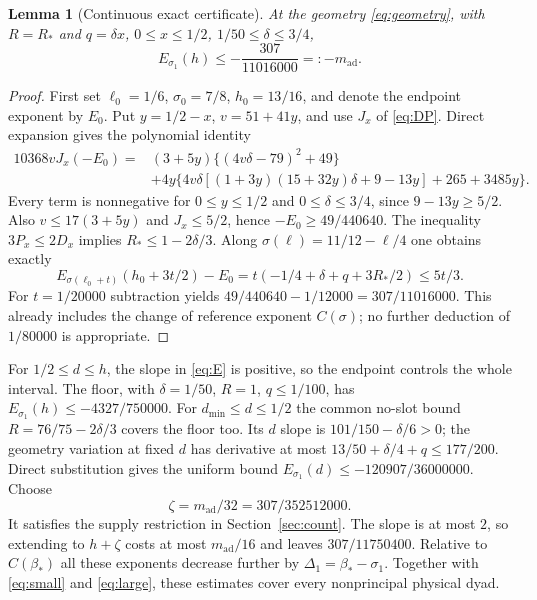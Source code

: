 \documentclass[11pt,a4paper]{article}
\newtheorem{lemma}[theorem]{Lemma}
\theoremstyle{definition}
\newcommand{\sig}{\sigma_1}
\newcommand{\bet}{\beta_*}
\begin{document}
\begin{lemma}[Continuous exact certificate]\label{lem:certificate}
At the geometry \eqref{eq:geometry}, with $R=R_*$ and
$q=\delta x$, $0\le x\le1/2$, $1/50\le\delta\le3/4$,
\[
 E_{\sig}(h)\le-\frac{307}{11016000}=:-m_{\mathrm{ad}}.
\]
\end{lemma}
\begin{proof}
First set $\ell_0=1/6$, $\sigma_0=7/8$, $h_0=13/16$,
and denote the endpoint exponent by $E_0$. Put
$y=1/2-x$, $v=51+41y$, and use $J_x$ of \eqref{eq:DP}.
Direct expansion gives the polynomial identity
\begin{align*}
 10368vJ_x(-E_0)
 ={}&(3+5y)\{(4v\delta-79)^2+49\}\\
 &+4y\{4v\delta[(1+3y)(15+32y)\delta+9-13y]
                       +265+3485y\}.
\end{align*}
Every term is nonnegative for $0\le y\le1/2$ and
$0\le\delta\le3/4$, since $9-13y\ge5/2$.
Also $v\le17(3+5y)$ and $J_x\le5/2$, hence
$-E_0\ge49/440640$.
The inequality $3P_x\le2D_x$ implies $R_*\le1-2\delta/3$.
Along $\sigma(\ell)=11/12-\ell/4$ one obtains exactly
\[
 E_{\sigma(\ell_0+t)}(h_0+3t/2)-E_0
 =t(-1/4+\delta+q+3R_*/2)\le5t/3.
\]
For $t=1/20000$ subtraction yields
$49/440640-1/12000=307/11016000$.
This already includes the change of reference exponent $C(\sigma)$;
no further deduction of $1/80000$ is appropriate.
\end{proof}

For $1/2\le d\le h$, the slope in \eqref{eq:E} is positive,
so the endpoint controls the whole interval.
The floor, with $\delta=1/50$, $R=1$, $q\le1/100$,
has $E_{\sig}(h)\le-4327/750000$.
For $d_{\min}\le d\le1/2$ the common no-slot bound
$R=76/75-2\delta/3$ covers the floor too. Its $d$ slope is
$101/150-\delta/6>0$; the geometry variation at fixed $d$
has derivative at most $13/50+\delta/4+q\le177/200$.
Direct substitution gives the uniform bound
$E_{\sig}(d)\le-120907/36000000$.
Choose
\begin{equation}\label{eq:zeta}
 \zeta=m_{\mathrm{ad}}/32=307/352512000.
\end{equation}
It satisfies the supply restriction in Section~\ref{sec:count}.
The slope is at most $2$, so extending to $h+\zeta$ costs at
most $m_{\mathrm{ad}}/16$ and leaves
$307/11750400$.
Relative to $C(\bet)$ all these exponents decrease further by
$\Delta_1=\bet-\sig$.
Together with \eqref{eq:small} and \eqref{eq:large},
these estimates cover every nonprincipal physical dyad.
\end{document}
